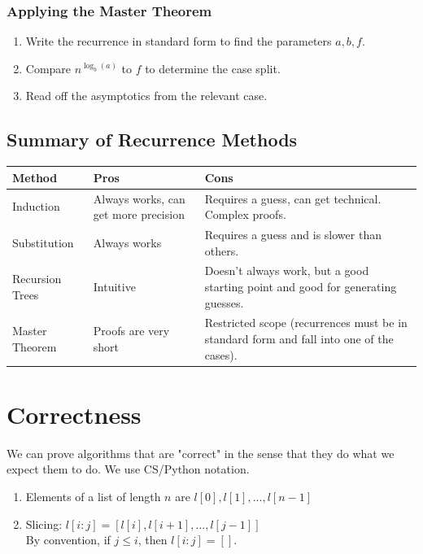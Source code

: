 \documentclass{article}
\begin{document}
\subsubsection{Applying the Master Theorem}
\begin{enumerate}
    \item Write the recurrence in standard form to find the parameters $a,b,f$.
    \item Compare $n^{\log_b(a)}$ to $f$ to determine the case split.
    \item Read off the asymptotics from the relevant case.
\end{enumerate}

\subsection{Summary of Recurrence Methods}
\begin{center}
    \setlength{\tabcolsep}{0.6em} %
    {\renewcommand{\arraystretch}{1.4}%
    \begin{tabular}{| p{3cm} | p{4cm} | p{8cm} |}
         \hline
         \textbf{Method} & \textbf{Pros} & \textbf{Cons} \\
         \hline
        Induction & Always works, can get more precision & Requires a guess, can get technical. Complex proofs.\\ 
        \hline
        Substitution & Always works & Requires a guess and is slower than others.\\
        \hline
        Recursion Trees & Intuitive & Doesn't always work, but a good starting point and good for generating guesses.\\
        \hline
        Master Theorem & Proofs are very short & Restricted scope (recurrences must be in standard form and fall into one of the cases).\\
        \hline
    \end{tabular}
    }
\end{center}

\section{Correctness}
We can prove algorithms that are "correct" in the sense that they do what we expect them to do. We use CS/Python notation.
\begin{enumerate}
    \item Elements of a list of length $n$ are $l[0], l[1], ..., l[n-1]$
    \item Slicing: $l[i:j] = [l[i], l[i + 1], ..., l[j - 1]]$\\
    By convention, if $j \leq i$, then $l[i:j] = []$.
\end{enumerate}
\end{document}
